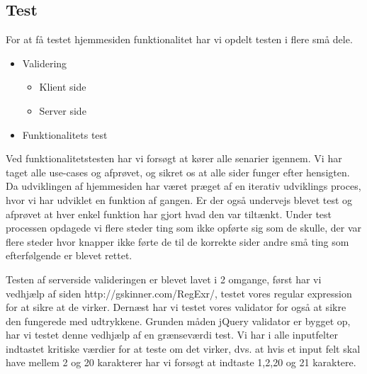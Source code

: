 \documentclass[a4paper]{article}
\begin{document}

\subsection{Test} %

For at få testet hjemmesiden funktionalitet har vi opdelt testen i flere små dele.

\begin{itemize}
  \item Validering
    \begin{itemize}
      \item Klient side
      \item Server side
    \end{itemize}
\item Funktionalitets test
\end{itemize}

Ved funktionalitetstesten har vi forsøgt at kører alle senarier igennem. Vi har taget alle use-cases og afprøvet, og sikret os at alle sider funger efter hensigten. Da udviklingen af hjemmesiden har været præget af en iterativ udviklings proces, hvor vi har udviklet en funktion af gangen. Er der også undervejs blevet test og afprøvet at hver enkel funktion har gjort hvad den var tiltænkt. Under test processen opdagede vi flere steder ting som ikke opførte sig som de skulle, der var flere steder hvor knapper ikke førte de til de korrekte sider andre små ting som efterfølgende er blevet rettet. 

Testen af serverside valideringen er blevet lavet i 2 omgange, først har vi vedhjælp af siden http://gskinner.com/RegExr/, testet vores regular expression for at sikre at de virker. Dernæst har vi testet vores validator for også at sikre den fungerede med udtrykkene. Grunden måden jQuery validator er bygget op, har vi testet denne vedhjælp af en grænseværdi test. Vi har i alle inputfelter indtastet kritiske værdier for at teste om det virker, dvs. at hvis et input felt skal have mellem 2 og 20 karakterer har vi forsøgt at indtaste 1,2,20 og 21 karaktere.  


\end{document}
